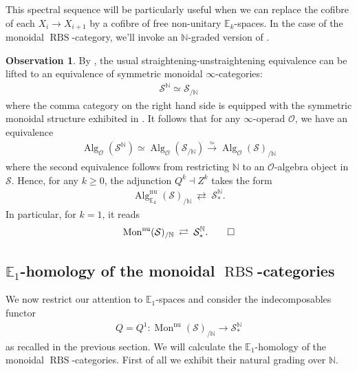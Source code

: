 \documentclass[12pt, reqno]{amsart}
\theoremstyle{plain}
\theoremstyle{definition}
\newtheorem{observation}[theorem]{Observation}
\newcommand{\N}{\mathbb N}
\begin{document}
This spectral sequence will be particularly useful when we can replace the cofibre of each $X_i\rightarrow X_{i+1}$ by a cofibre of free non-unitary $\mathbb{E}_k$-spaces. In the case of the monoidal $\operatorname{RBS}$-category, we'll invoke an $\N$-graded version of .


\begin{observation}\label{monoidal grothendieck}
By \cite{Ramzi}, the usual straightening-unstraightening equivalence can be lifted to an equivalence of symmetric monoidal $\infty$-categories:
\begin{align*}
\mathcal{S}^\N\simeq \mathcal{S}_{/\N}
\end{align*}
where the comma category on the right hand side is equipped with the symmetric monoidal structure exhibited in \cite[\S 2.2.2]{LurieHA}. It follows that for any $\infty$-operad $\mathcal{O}$, we have an equivalence
\begin{align*}
\operatorname{Alg}_{\mathcal{O}}(\mathcal{S}^{\N})\simeq \operatorname{Alg}_{\mathcal{O}}(\mathcal{S}_{/\N})\xrightarrow{\simeq} \operatorname{Alg}_{\mathcal{O}}(\mathcal{S})_{/\N}
\end{align*}
where the second equivalence follows from \cite[Lemma 12.2]{AntolinCamarenaBarthel} restricting $\N$ to an $\mathcal{O}$-algebra object in $\mathcal{S}$. Hence, for any $k\geq 0$, the adjunction $Q^k\dashv Z^k$ takes the form
\begin{align*}
\operatorname{Alg}_{\mathbb{E}_k}^{\operatorname{nu}}(\mathcal{S})_{/\N}\ \mathop{\rightleftarrows} \ \mathcal{S}_\ast^{\N}.
\end{align*}
In particular, for $k=1$, it reads
\begin{equation*}
\operatorname{Mon}^{\operatorname{nu}}(\mathcal{S})_{/\N}\ \mathop{\rightleftarrows} \ \mathcal{S}_\ast^{\N}.\qedhere
\end{equation*}
\end{observation}



\subsection{\texorpdfstring{$\mathbb{E}_1$}{E1}-homology of the monoidal \texorpdfstring{$\operatorname{RBS}$}{RBS}-categories}

We now restrict our attention to $\mathbb{E}_1$-spaces and consider the indecomposables functor
\begin{align*}
Q=Q^1\colon \operatorname{Mon}^{\operatorname{nu}}(\mathcal{S})_{/\N}\rightarrow \mathcal{S}^\N_\ast
\end{align*}
as recalled in the previous section. We will calculate the $\mathbb{E}_1$-homology of the monoidal $\operatorname{RBS}$-categories. First of all we exhibit their natural grading over $\N$.
\end{document}

